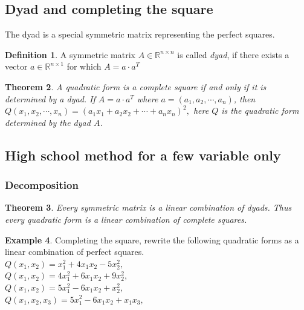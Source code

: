 \documentclass[aspectratio=169,notheorems]{corvinusmetropolis}
\newtheorem{theorem}{Theorem}
\theoremstyle{definition}
\newtheorem{definition}[theorem]{Definition}
\newtheorem{example}[theorem]{Example}
\begin{document}
\subsection{Dyad and completing the square}
\begin{frame}
    The dyad is a special symmetric matrix representing the perfect squares.
    \begin{definition}
        A symmetric matrix $A\in\mathbb{R}^{n\times n}$ is called \alert{\emph{dyad}}, 
        if there exists a vector
        $a\in\mathbb{R}^{n\times 1}$ for which
        \(
            A=a\cdot a^T
        \)
    \end{definition}
    \begin{theorem}
        A quadratic form is a complete square if and only if it is determined by a dyad.
        If $A=a\cdot a^T$ where $a=\left( a_1,a_2,\cdots,a_n \right)$, then
          \(
             Q\left( x_1,x_2,\cdots,x_n \right)=
              \left( a_1x_1+a_2x_2+\cdots+a_nx_n \right)^2,
          \)
        here $Q$ is the quadratic form determined by the dyad $A$.
    \end{theorem}
\end{frame}
\subsection{High school method for a few variable only}
\begin{frame}
    \frametitle{Decomposition}
    \begin{theorem}
        Every symmetric matrix is a linear combination of dyads. Thus
        every quadratic form is a linear combination of complete squares.
    \end{theorem}
\begin{example}
    Completing the square, rewrite the following quadratic forms as a linear combination of perfect squares.\\
    $Q\left( x_1,x_2 \right)=x_1^2+4x_1x_2-5x_2^2,$\\
    $Q\left( x_1,x_2 \right)=4x_1^2+6x_1x_2+9x_2^2,$\\
    $Q\left( x_1,x_2 \right)=5x_1^2-6x_1x_2+x_2^2,$\\
    $Q\left( x_1,x_2,x_3 \right)=5x_1^2-6x_1x_2+x_1x_3,$\\
\end{example}
\end{frame}
\end{document}
